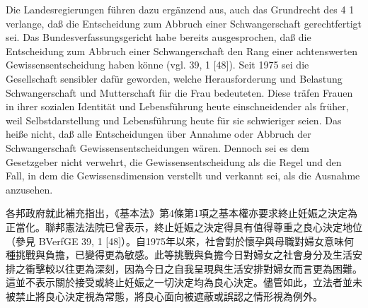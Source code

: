 \documentclass[12pt]{article}
\begin{document}
\begin{sourcepara}[title={原文C.27}]
Die Landesregierungen führen dazu ergänzend aus, auch das Grundrecht des \abbrArt{} 4 \abbrAbs{} 1 \abbrGG{}\ggfnArtFourOneDE{} verlange, daß die Entscheidung zum Abbruch einer Schwangerschaft gerechtfertigt sei. Das Bundesverfassungsgericht habe bereits ausgesprochen, daß die Entscheidung zum Abbruch einer Schwangerschaft den Rang einer achtenswerten Gewissensentscheidung haben könne (vgl. \abbrBVerfGE{} 39, 1 [48]). Seit 1975 sei die Gesellschaft sensibler dafür geworden, welche Herausforderung und Belastung Schwangerschaft und Mutterschaft für die Frau bedeuteten. Diese träfen Frauen in ihrer sozialen Identität und Lebensführung heute einschneidender als früher, weil Selbstdarstellung und Lebensführung heute für sie schwieriger seien. Das heiße nicht, daß alle Entscheidungen über Annahme oder Abbruch der Schwangerschaft Gewissensentscheidungen wären. Dennoch sei es dem Gesetzgeber nicht verwehrt, die Gewissensentscheidung als die Regel und den Fall, in dem die Gewissensdimension verstellt und verkannt sei, als die Ausnahme anzusehen.
\end{sourcepara}
\begin{transpara}
各邦政府就此補充指出，《基本法》第4條第1項\ggfnArtFourOneZH{}之基本權亦要求終止妊娠之決定為正當化。聯邦憲法法院已曾表示，終止妊娠之決定得具有值得尊重之良心決定地位（參見 BVerfGE 39, 1 [48]）。自1975年以來，社會對於懷孕與母職對婦女意味何種挑戰與負擔，已變得更為敏感。此等挑戰與負擔今日對婦女之社會身分及生活安排之衝擊較以往更為深刻，因為今日之自我呈現與生活安排對婦女而言更為困難。這並不表示關於接受或終止妊娠之一切決定均為良心決定。儘管如此，立法者並未被禁止將良心決定視為常態，將良心面向被遮蔽或誤認之情形視為例外。
\end{transpara}
\end{document}
